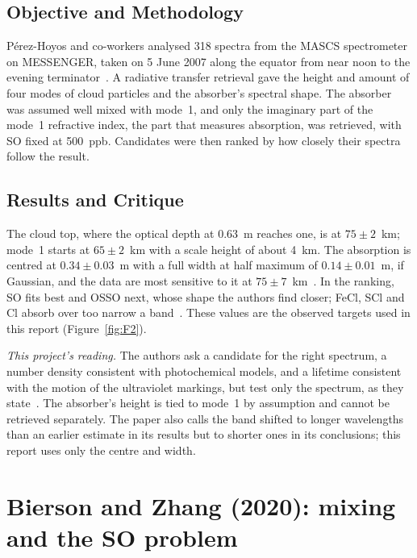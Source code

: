 \subsection{Objective and Methodology}

P\'erez-Hoyos and co-workers analysed 318 spectra from the MASCS spectrometer on
MESSENGER, taken on 5 June 2007 along the equator from near noon to the evening
terminator~\cite{perezhoyos2018}. A radiative transfer retrieval gave the height and
amount of four modes of cloud particles and the absorber's spectral shape. The absorber
was assumed well mixed with mode~1, and only the imaginary part of the mode~1 refractive
index, the part that measures absorption, was retrieved, with SO fixed at
500~ppb. Candidates were then ranked by how closely their spectra follow the result.

\subsection{Results and Critique}

The cloud top, where the optical depth at 0.63~\textmu m reaches one, is at $75 \pm 2$~km;
mode~1 starts at $65 \pm 2$~km with a scale height of about 4~km. The absorption is
centred at $0.34 \pm 0.03$~\textmu m with a full width at half maximum of
$0.14 \pm 0.01$~\textmu m, if Gaussian, and the data are most sensitive to it at
$75 \pm 7$~km~\cite{perezhoyos2018}. In the ranking, SO fits best and OSSO next,
whose shape the authors find closer; FeCl, SCl and Cl absorb over too
narrow a band~\cite{perezhoyos2018}. These values are the observed targets used in this
report (Figure~\ref{fig:F2}).

\emph{This project's reading.} The authors ask a candidate for the right spectrum, a
number density consistent with photochemical models, and a lifetime consistent with the
motion of the ultraviolet markings, but test only the spectrum, as they
state~\cite{perezhoyos2018}. The absorber's height is tied to mode~1 by assumption and
cannot be retrieved separately. The paper also calls the band shifted to longer
wavelengths than an earlier estimate in its results but to shorter ones in its
conclusions; this report uses only the centre and width.

\section{Bierson and Zhang (2020): mixing and the \texorpdfstring{SO}{SO2} problem}
\label{sec:lit-bz}

